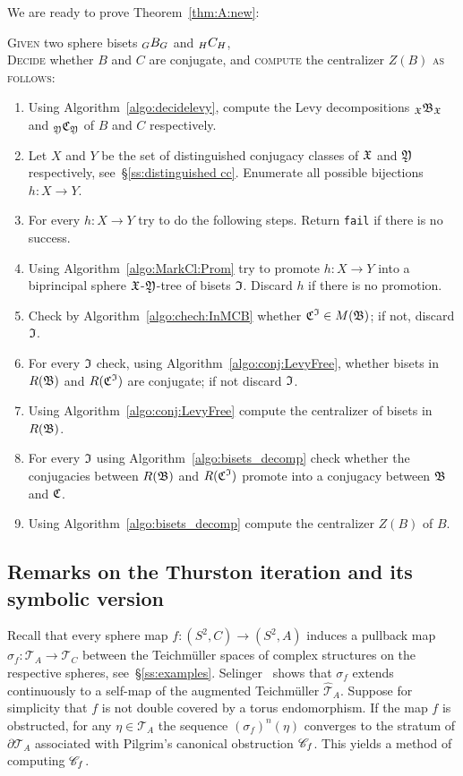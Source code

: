 \documentclass{amsart}
\begin{document}
\noindent We are ready to prove Theorem~\ref{thm:A:new}:
\begin{algo}\label{algo:Decid}
  \textsc{Given} two sphere bisets $\subscript G B_G$ and  $\subscript H C_H$,\\
  \textsc{Decide} whether $B$ and $C$ are conjugate, and \textsc{compute} the centralizer $Z(B)$ \textsc{as follows:}\\\upshape
  \begin{enumerate}
  \item Using Algorithm~\ref{algo:decidelevy}, compute the Levy
    decompositions $\subscript \gf\gfB_\gf$ and
    $\subscript \gfY\gfC_\gfY$ of $B$ and $C$
    respectively.
  \item Let $X$ and $Y$ be the set of distinguished conjugacy classes
    of ${\mathfrak X}$ and ${\mathfrak Y}$ respectively, see~\S\ref{ss:distinguished
      cc}. Enumerate all possible bijections $h\colon X\to Y$.
  \item For every $h\colon X\to Y$ try to do the following
    steps. Return \texttt{fail} if there is no success.
  \item Using Algorithm~\ref{algo:MarkCl:Prom} try to promote
    $h\colon X\to Y$ into a biprincipal sphere ${\mathfrak X}$-${\mathfrak Y}$-tree of
    bisets ${\mathfrak I}$. Discard $h$ if there is no promotion.
  \item Check by Algorithm~\ref{algo:chech:InMCB} whether
    ${\mathfrak C}^{\mathfrak I} \in M({\mathfrak B})$; if not, discard
    ${\mathfrak I}$.
  \item For every ${\mathfrak I}$ check, using
    Algorithm~\ref{algo:conj:LevyFree}, whether bisets in $R({\mathfrak B})$
    and $R({\mathfrak C}^{\mathfrak I})$ are conjugate; if not discard
    ${\mathfrak I}$.
  \item Using Algorithm~\ref{algo:conj:LevyFree} compute the centralizer
    of bisets in $R({\mathfrak B})$.
  \item For every ${\mathfrak I}$ using Algorithm~\ref{algo:bisets_decomp}
    check whether the conjugacies between $R({\mathfrak B})$ and
    $R({\mathfrak C}^{\mathfrak I})$ promote into a conjugacy between
    ${\mathfrak B}$ and ${\mathfrak C}$.
  \item Using Algorithm~\ref{algo:bisets_decomp} compute the centralizer
    $Z(B)$ of $B$.
  \end{enumerate}
\end{algo}

\subsection{Remarks on the Thurston iteration and its symbolic version}\label{ss:rem:Thurston iter}
Recall that every sphere map $f\colon (S^2,C)\to(S^2,A)$ induces a
pullback map $\sigma_f\colon\mathscr T_A\to\mathscr T_C$ between the
Teichm\"uller spaces of complex structures on the respective spheres,
see~\S\ref{ss:examples}. Selinger~\cite{selinger:augts} shows that
$\sigma_f$ extends continuously to a self-map of the augmented
Teichmüller $\widehat{\mathscr T}_A$. Suppose for simplicity that $f$
is not double covered by a torus endomorphism. If the map $f$ is
obstructed, for any $\eta\in \mathscr T_A$ the sequence
$(\sigma_f)^n(\eta)$ converges to the stratum of
$\partial\mathscr T_A$ associated with Pilgrim's canonical obstruction
${\mathscr C}_f$.  This yields a method of computing ${\mathscr C}_f$.
\end{document}
